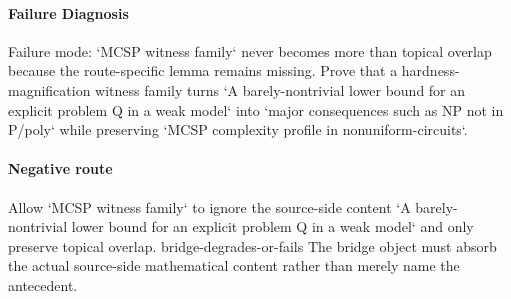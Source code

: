 \documentclass[11pt]{article}
\begin{document}
\paragraph{Failure Diagnosis}
Failure mode: `MCSP witness family` never becomes more than topical overlap because the route-specific lemma remains missing. Prove that a hardness-magnification witness family turns `A barely-nontrivial lower bound for an explicit problem Q in a weak model` into `major consequences such as NP not in P/poly` while preserving `MCSP complexity profile in nonuniform-circuits`.
\paragraph{Negative route}
Allow `MCSP witness family` to ignore the source-side content `A barely-nontrivial lower bound for an explicit problem Q in a weak model` and only preserve topical overlap. bridge-degrades-or-fails The bridge object must absorb the actual source-side mathematical content rather than merely name the antecedent.
\end{document}
